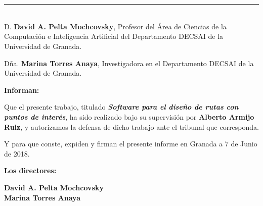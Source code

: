 \chapter*{}
\thispagestyle{empty}

\noindent\rule[-1ex]{\textwidth}{2pt}\\[4.5ex]

D. \textbf{David A. Pelta Mochcovsky}, Profesor del Área de Ciencias de la Computación e Inteligencia Artificial del Departamento DECSAI de la Universidad de Granada.\newline

Dña. \textbf{Marina Torres Anaya}, Investigadora en el Departamento DECSAI de la Universidad de Granada.

\vspace{0.5cm}

\textbf{Informan:}

\vspace{0.5cm}

Que el presente trabajo, titulado \textit{\textbf{Software para el diseño de rutas con puntos de interés}},
ha sido realizado bajo su supervisión por \textbf{Alberto Armijo Ruiz}, y autorizamos la defensa de dicho trabajo ante el tribunal
que corresponda.

\vspace{0.5cm}

Y para que conste, expiden y firman el presente informe en Granada a 7 de Junio de 2018.

\vspace{1cm}

\textbf{Los directores:}

\vspace{5cm}

\noindent \textbf{David A. Pelta Mochcovsky} \\
\noindent \textbf{Marina Torres Anaya}


